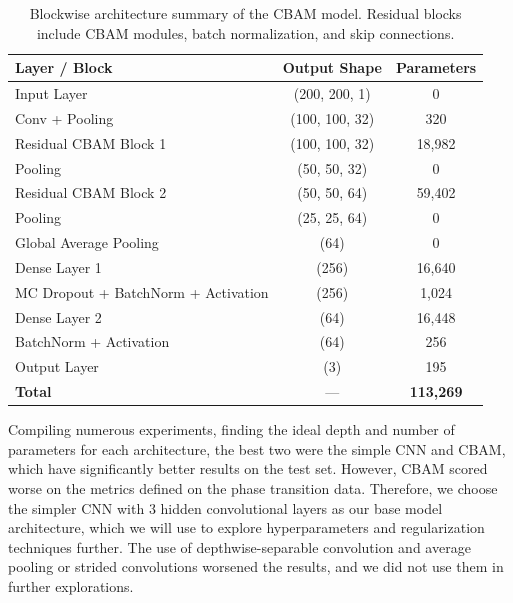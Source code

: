 \begin{table}[H]
\centering
\scriptsize
\begin{tabular}{lcc}
    \toprule
    \textbf{Layer / Block} & \textbf{Output Shape} & \textbf{Parameters} \\
    \midrule
    Input Layer                          & (200, 200, 1)     & 0 \\
    Conv + Pooling          & (100, 100, 32)    & 320 \\
    Residual CBAM Block 1                 & (100, 100, 32)    & 18,982 \\
    Pooling                             & (50, 50, 32)      & 0 \\
    Residual CBAM Block 2                 & (50, 50, 64)      & 59,402 \\
    Pooling                             & (25, 25, 64)      & 0 \\
    Global Average Pooling                 & (64)              & 0 \\
    Dense Layer 1                       & (256)             & 16,640 \\
    MC Dropout + BatchNorm + Activation & (256)             & 1,024 \\
    Dense Layer 2                       & (64)              & 16,448 \\
    BatchNorm + Activation              & (64)              & 256 \\
    Output Layer                       & (3)     & 195 \\
    \midrule
    \textbf{Total}                     & —                 & \textbf{113,269} \\
    \bottomrule
\end{tabular}
\caption{Blockwise architecture summary of the CBAM model. Residual blocks include CBAM modules, batch normalization, and skip connections.}
\label{tab:cbam_summary}
\end{table}

Compiling numerous experiments, finding the ideal depth and number of parameters for each architecture, the best two were the simple CNN and CBAM, which have significantly better results on the test set. However, CBAM scored worse on the metrics defined on the phase transition data. Therefore, we choose the simpler CNN with $3$ hidden convolutional layers as our base model architecture, which we will use to explore hyperparameters and regularization techniques further. The use of depthwise-separable convolution and average pooling or strided convolutions worsened the results, and we did not use them in further explorations.

